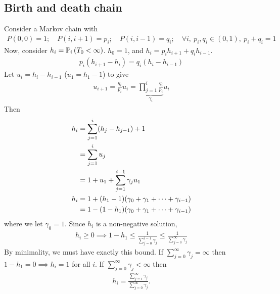 \subsection{Birth and death chain}
Consider a Markov chain with
\begin{align*}
	P(0, 0) = 1;\quad P(i,i+1) = p_i;\quad P(i,i-1) = q_i;\quad \forall i,\ p_i, q_i \in (0, 1), \ p_i + q_i = 1
\end{align*}
Now, consider $h_i = \mathbb{P}_{i}\left({T_0 < \infty}\right)$.
$h_0 = 1$, and $h_i = p_i h_{i+1} + q_i h_{i-1}$.
\begin{align*}
	p_i (h_{i+1} - h_i) = q_i (h_i - h_{i-1})
\end{align*}
Let $u_i = h_i - h_{i-1}$ ($u_1 = h_1 - 1$) to give
\begin{align*}
	u_{i+1} = \frac{q_i}{p_i} u_i = \underbrace{\prod_{j=1}^i \frac{q_i}{p_i}}_{\gamma_i} u_i
\end{align*}
Then
\begin{align*}
	h_i &= \sum_{j=1}^{i} (h_j - h_{j - 1}) + 1 \\
	&= \sum_{j=1}^{i} u_j \\
	&= 1 + u_1 + \sum_{j=1}^{i-1} \gamma_j u_1 \\  
	h_i &= 1 + (h_1 - 1) \qty( \gamma_0 + \gamma_1 + \dots + \gamma_{i-1}) \\
	&= 1 - (1 - h_1) \qty( \gamma_0 + \gamma_1 + \dots + \gamma_{i-1})
\end{align*}
where we let $\gamma_0 = 1$.
Since $h_i$ is a non-negative solution,
\begin{align*}
	h_i \geq 0 \implies 1 - h_1 \leq \frac{1}{\sum_{j=0}^{i-1} \gamma_j} \leq \frac{1}{\sum_{j=0}^{\infty} \gamma_j}
\end{align*}
By minimality, we must have exactly this bound.
If $\sum_{j=0}^\infty \gamma_j = \infty$ then $1 - h_1 = 0 \implies h_i = 1$ for all $i$.
If $\sum_{j=0}^\infty \gamma_j < \infty$ then
\begin{align*}
	h_i = \frac{\sum_{j=i}^\infty \gamma_j}{\sum_{j=0}^\infty \gamma_j}.
\end{align*}


